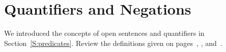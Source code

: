 \section{Quantifiers and Negations}\label{S:quantifier}
%
\setcounter{previewactivity}{0}


%
We introduced the concepts of open sentences and quantifiers in Section~\ref{S:predicates}. Review the definitions given on pages~\pageref{D:universal}, \pageref{D:truthset}, 
and~\pageref{D:every}.















%
%
%

